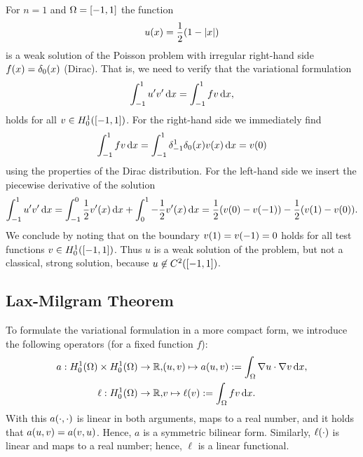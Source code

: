 \begin{example}
	For \(n = 1\) and \(\Omega = \brackets*{-1, 1}\) the function
	\[
		u\parentheses*{x} = \frac{1}{2}\parentheses*{1 - \absolute*{x}}
	\]
	is a weak solution of the Poisson problem with irregular right-hand side \(f\parentheses*{x} = \delta_0\parentheses*{x}\) (Dirac).
	That is, we need to verify that the variational formulation
	\[
		\int_{-1}^1 u'v'\d x = \int_{-1}^1 fv\d x,
	\]
	holds for all \(v \in H_0^1\parentheses*{\brackets*{-1, 1}}\).
	For the right-hand side we immediately find
	\[
		\int_{-1}^1 fv\d x = \int_{-1}^1 \delta_{-1}^1 \delta_0\parentheses*{x}v\parentheses*{x}\d x = v\parentheses*{0}
	\]
	using the properties of the Dirac distribution.
	For the left-hand side we insert the piecewise derivative of the solution
	\[
		\int_{-1}^1 u'v'\d x = \int_{-1}^0 \frac{1}{2}v'\parentheses*{x}\d x + \int_0^1 -\frac{1}{2}v'\parentheses*{x}\d x = \frac{1}{2}\parentheses*{v\parentheses*{0} - v\parentheses*{-1}} - \frac{1}{2}\parentheses*{v\parentheses*{1} - v\parentheses*{0}}.
	\]
	We conclude by noting that on the boundary \(v\parentheses*{1} = v\parentheses*{-1} = 0\) holds for all test functions \(v \in H_0^1\parentheses*{\brackets*{-1, 1}}\).
	Thus \(u\) is a weak solution of the problem, but not a classical, strong solution, because \(u \not\in C^2\parentheses*{\brackets*{-1, 1}}\).
\end{example}


\subsection{Lax-Milgram Theorem}

To formulate the variational formulation in a more compact form, we introduce the following operators (for a fixed function \(f\)):
\begin{align*}
	a: H_0^1\parentheses*{\Omega} \times H_0^1\parentheses*{\Omega} \to \R, &\parentheses*{u, v} \mapsto a\parentheses*{u, v} := \int_\Omega \nabla u \cdot \nabla v\d x,\\
	\ell: H_0^1\parentheses*{\Omega} \to \R, &v \mapsto \ell\parentheses*{v} := \int_\Omega fv\d x.
\end{align*}
With this \(a\parentheses*{\cdot, \cdot}\) is linear in both arguments, maps to a real number, and it holds that \(a\parentheses*{u, v} = a\parentheses*{v, u}\).
Hence, \(a\) is a symmetric bilinear form.
Similarly, \(\ell\parentheses*{\cdot}\) is linear and maps to a real number; hence, \(\ell\) is a linear functional.

